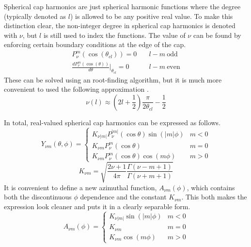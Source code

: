 \documentclass[12pt,letterpaper]{article}
\begin{document}
  Spherical cap harmonics are just spherical harmonic functions where the degree (typically denoted as \(l\)) is allowed to be any positive real value.  To make this distinction clear, the non-integer degree in spherical cap harmonics is denoted with \(\nu\), but \(l\) is still used to index the functions.  The value of \(\nu\) can be found by enforcing certain boundary conditions at the edge of the cap.
  \begin{align}
    P_\nu^m(\cos(\theta_{cl})) = 0 \quad &l-m\:\text{odd} \\
    \frac{dP_\nu^m(\cos(\theta))}{d\theta}|_{\theta_{cl}} = 0 \quad &l-m\:\text{even}
  \end{align}
  These can be solved using an root-finding algorithm, but it is much more convenient to used the following approximation \citep{Thebault2006}.
  \begin{equation}
    \nu(l) \approx \left(2l+\frac{1}{2}\right)\frac{\pi}{2\theta_{cl}}-\frac{1}{2}
  \end{equation}

  In total, real-valued spherical cap harmonics can be expressed as follows.
  \begin{equation}
    \label{eqn:spharm}
    Y_{\nu m}(\theta,\phi) = \begin{cases}
                                K_{\nu |m|}P_\nu^{|m|}(\cos\theta)\sin(|m|\phi) & m < 0 \\
                                K_{\nu m}P_\nu^{m}(\cos\theta) & m = 0 \\
                                K_{\nu m}P_\nu^{m}(\cos\theta)\cos(m\phi) & m > 0
                             \end{cases}
  \end{equation}
  \begin{equation}
    K_{\nu m} = \sqrt{\frac{2\nu+1}{4\pi}\frac{\Gamma(\nu-m+1)}{\Gamma(\nu+m+1)}}
  \end{equation}
  It is convenient to define a new azimuthal function, \(A_{\nu m}(\phi)\), which contains both the discontinuous \(\phi\) dependence and the constant \(K_{\nu m}\).  This both makes the expression look cleaner and puts it in a clearly separable form.
  \begin{equation}
    \label{eqn:A}
    A_{\nu m}(\phi) = \begin{cases}
                        K_{\nu |m|}\sin(|m|\phi) & m < 0 \\
                        K_{\nu m} & m = 0 \\
                        K_{\nu m}\cos(m\phi) & m > 0
                      \end{cases}
  \end{equation}
\end{document}
